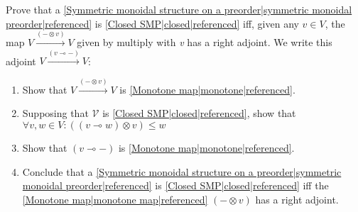 
Prove that a \ref{Symmetric monoidal structure on a preorder|symmetric monoidal preorder|referenced} is \ref{Closed SMP|closed|referenced} iff, given any $v \in V$, the map $V \xrightarrow{(-\otimes v)}V$ given by multiply with \emph{v} has a right adjoint.  We write this adjoint $V \xrightarrow{(v \multimap -)}V$:
\begin{enumerate}
  \item Show that $V \xrightarrow{(-\otimes v)}V$ is \ref{Monotone map|monotone|referenced}.
  \item Supposing that $\mathcal{V}$ is \ref{Closed SMP|closed|referenced}, show that $\forall v,w \in V: ((v \multimap w)\otimes v) \leq w$
  \item Show that $(v \multimap -)$ is \ref{Monotone map|monotone|referenced}.
  \item Conclude that a \ref{Symmetric monoidal structure on a preorder|symmetric monoidal preorder|referenced} is \ref{Closed SMP|closed|referenced} iff the \ref{Monotone map|monotone map|referenced} $(- \otimes v)$ has a right adjoint.
\end{enumerate}